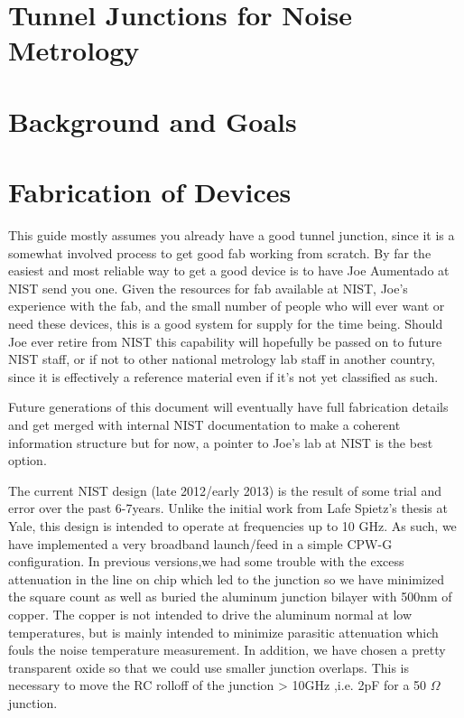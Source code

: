 \documentclass[11pt]{article}
\begin{document}
\section{
Tunnel Junctions for Noise Metrology}


\section{
Background and Goals}



\section{
Fabrication of Devices}



This guide mostly assumes you already have a good tunnel junction, since it is a somewhat involved process to get good fab working from scratch. By far the easiest and most reliable way to get a good device is to have Joe Aumentado at NIST send you one.  Given the resources for fab available at NIST, Joe's experience with the fab, and the small number of people who will ever want or need these devices, this is a good system for supply for the time being.  Should Joe ever retire from NIST this capability will hopefully be passed on to future NIST staff, or if not to other national metrology lab staff in another country, since it is effectively a reference material even if it's not yet classified as such.    





    Future generations of this document will eventually have full fabrication details and get merged with internal NIST documentation to make a coherent information structure but for now, a pointer to Joe's lab at NIST is the best option.





The current NIST design (late 2012/early 2013) is the result of some trial and error over the past 6-7years. Unlike the initial work from Lafe Spietz’s thesis at Yale, this design is intended to operate at frequencies up to 10 GHz. As such, we have implemented a very broadband launch/feed in a simple CPW-G conﬁguration. In previous versions,we had some trouble with the excess attenuation in the line on chip which led to the junction so we have minimized the square count as well as buried the aluminum junction bilayer with 500nm of copper. The copper is not intended to drive the aluminum normal at low temperatures, but is mainly intended to minimize parasitic attenuation which fouls the noise temperature measurement. In addition, we have chosen a pretty transparent oxide so that we could use smaller junction overlaps. This is necessary to move the RC rolloff of the junction > 10GHz ,i.e. 2pF for a 50 $\Omega$ junction.
\end{document}
